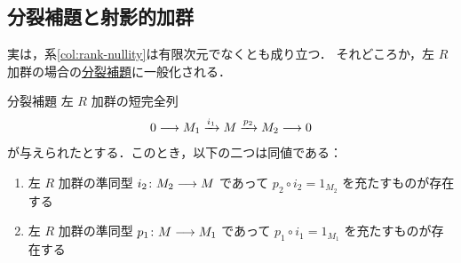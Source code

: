 \documentclass[rep_main]{subfiles}
\begin{document}
\subsection{分裂補題と射影的加群}

実は，系\ref{col:rank-nullity}は有限次元でなくとも成り立つ．
それどころか，左 $R$ 加群の場合の\hyperref[lem:splitting]{分裂補題}に一般化される．

\begin{mylem}[label=lem:splitting]{分裂補題}
    左 $R$ 加群の短完全列
    \begin{align}
        \label{SES:3-1}
        0 \longrightarrow M_1 \xrightarrow{i_1} M \xrightarrow{p_2} M_2 \longrightarrow 0
    \end{align}
    が与えられたとする．このとき，以下の二つは同値である：
    \begin{enumerate}
        \item 左 $R$ 加群の準同型 $i_2 \colon M_2 \longrightarrow M$ であって $p_2 \circ i_2 = 1_{M_2}$ を充たすものが存在する
        \item 左 $R$ 加群の準同型 $p_1 \colon M \longrightarrow M_1$ であって $p_1 \circ i_1 = 1_{M_1}$ を充たすものが存在する
    \end{enumerate}
\end{mylem}
\end{document}
